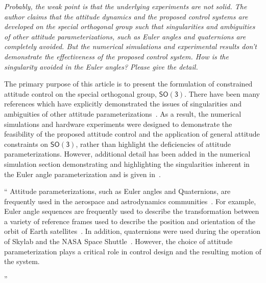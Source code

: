 \documentclass[11pt]{article}
\newcommand{\SO}{\ensuremath{\mathsf{SO(3)}}}
\newenvironment{correction}{\begin{list}{}{\setlength{\leftmargin}{1cm}\setlength{\rightmargin}{1cm}}\vspace{\parsep}\item[]``}{''\end{list}}
\begin{document}
\begin{enumerate}
\item \textit{Probably, the weak point is that the underlying experiments are not solid. The author claims that the attitude dynamics and the proposed control systems are developed on the special orthogonal group such that singularities and ambiguities of other attitude parameterizations, such as Euler angles and quaternions are completely avoided.  But the numerical simulations and experimental results don't demonstrate the effectiveness of the proposed control system. How is the singularity avoided in the Euler angles? Please give the detail.}

The primary purpose of this article is to present the formulation of constrained attitude control on the special orthogonal group, \( \SO \).
There have been many references which have explicitly demonstrated the issues of singularities and ambiguities of other attitude parameterizations~\cite{chaturvedi2011a,bhat2000,hughes2004,shuster1993}.
As a result, the numerical simulations and hardware experiments were designed to demonstrate the feasibility of the proposed attitude control and the application of general attitude constraints on \( \SO \), rather than highlight the deficiencies of attitude parameterizations.
However, additional detail has been added in the numerical simulation section demonstrating and highlighting the singularities inherent in the Euler angle parameterization and is given in~.

\begin{correction}
    Attitude parameterizations, such as Euler angles and Quaternions, are frequently used in the aerospace and astrodynamics communities~\cite{vallado2007}.
For example, Euler angle sequences are frequently used to describe the transformation between a variety of reference frames used to describe the position and orientation of the orbit of Earth satellites~\cite{vallado2007}.
In addition, quaternions were used during the operation of Skylab and the NASA Space Shuttle~\cite{hughes2004}.
However, the choice of attitude parameterization plays a critical role in control design and the resulting motion of the system.


\end{correction}
\end{enumerate}
\end{document}
